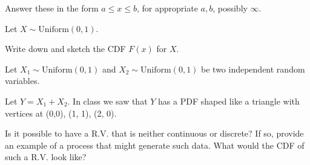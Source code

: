 \documentclass[12pt]{exam}
\begin{document}
\begin{questions}

\question
Answer these in the form $a \leq x \leq b$, for appropriate $a, b$, possibly $\infty$.



\question
Let $X \sim \text{Uniform}(0, 1)$.

Write down and sketch the CDF $F(x)$ for $X$.

\question
Let $X_1 \sim \text{Uniform}(0, 1)$ and $X_2 \sim \text{Uniform}(0, 1)$ be two independent random variables.

Let $Y = X_1 + X_2$.
In class we saw that $Y$ has a PDF shaped like a triangle with vertices at (0,0), (1, 1), (2, 0).


\question
Is it possible to have a R.V. that is neither continuous or discrete?
If so, provide an example of a process that might generate such data.
What would the CDF of such a R.V. look like?


\end{questions}
\end{document}
